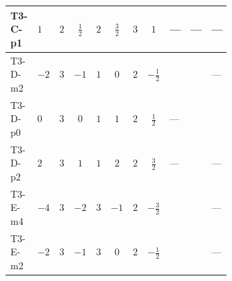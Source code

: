 \documentclass[8pt]{article}
\begin{document}
\begin{landscape}
\begin{longtable}{@{}llcccccc >{\raggedright\arraybackslash}p{0.21\linewidth} >{\raggedright\arraybackslash}p{0.21\linewidth} >{\raggedright\arraybackslash}p{0.21\linewidth}@{}}
\midrule
T3-C-p1 & $1$ & $2$ & $\frac{1}{2}$ & $2$ & $\frac{3}{2}$ & $3$ & $1$ & --- & --- & --- \\
\midrule
T3-D-m2 & $-2$ & $3$ & $-1$ & $1$ & $0$ & $2$ & $-\frac{1}{2}$ & \scriptsize\adjustbox{max width=\linewidth}{$\begin{gathered} +{g_1}^2 \left(-4 {g_2}^2-\frac{15 {\lambda_{HS_1}^{(A)}}}{2}\right)\end{gathered}$} & \scriptsize\adjustbox{max width=\linewidth}{$\begin{gathered} -\frac{33 {g_2}^2 {\lambda_{HS_1}^{(A)}}}{2}\end{gathered}$} & --- \\
\midrule
T3-D-p0 & $0$ & $3$ & $0$ & $1$ & $1$ & $2$ & $\frac{1}{2}$ & --- & \scriptsize\adjustbox{max width=\linewidth}{$\begin{gathered} -\frac{33 {g_2}^2 {\lambda_{HS_1}^{(A)}}}{2}\end{gathered}$} & \scriptsize\adjustbox{max width=\linewidth}{$\begin{gathered} -\frac{3 {g_1}^2 {\lambda_{HS_1}^{(A)}}}{2}\end{gathered}$} \\
\midrule
T3-D-p2 & $2$ & $3$ & $1$ & $1$ & $2$ & $2$ & $\frac{3}{2}$ & --- & \scriptsize\adjustbox{max width=\linewidth}{$\begin{gathered} -\frac{33 {g_2}^2 {\lambda_{HS_1}^{(A)}}}{2}\end{gathered}$} & --- \\
\midrule
T3-E-m4 & $-4$ & $3$ & $-2$ & $3$ & $-1$ & $2$ & $-\frac{3}{2}$ & \scriptsize\adjustbox{max width=\linewidth}{$\begin{gathered} +{g_1}^2 \left(-8 {g_2}^2-\frac{51 {\lambda_{HS_1}^{(A)}}}{2}\right)\end{gathered}$} & \scriptsize\adjustbox{max width=\linewidth}{$\begin{gathered} -\frac{33 {g_2}^2 {\lambda_{HS_1}^{(A)}}}{2}\end{gathered}$} & --- \\
\midrule
T3-E-m2 & $-2$ & $3$ & $-1$ & $3$ & $0$ & $2$ & $-\frac{1}{2}$ & \scriptsize\adjustbox{max width=\linewidth}{$\begin{gathered} +{g_1}^2 \left(-4 {g_2}^2-\frac{15 {\lambda_{HS_1}^{(A)}}}{2}\right)\end{gathered}$} & \scriptsize\adjustbox{max width=\linewidth}{$\begin{gathered} -\frac{33 {g_2}^2 {\lambda_{HS_1}^{(A)}}}{2}\end{gathered}$} & --- \\

\end{longtable}
\end{landscape}
\end{document}
